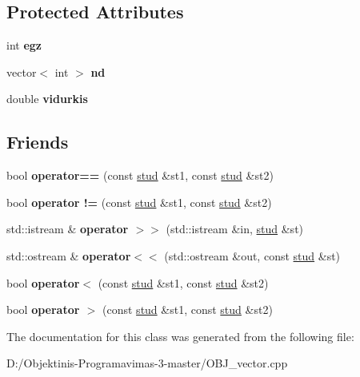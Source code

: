 \subsection*{Protected Attributes}
\begin{DoxyCompactItemize}
\item 
\mbox{\label{classstud_a4f0cd476d21347c3ded4b71eb5e92090}} 
int {\bfseries egz}
\item 
\mbox{\label{classstud_ab715143fae8186a247051f4a078244a8}} 
vector$<$ int $>$ {\bfseries nd}
\item 
\mbox{\label{classstud_ad6a131f5c8627777b639aa6a3517057c}} 
double {\bfseries vidurkis}
\end{DoxyCompactItemize}
\subsection*{Friends}
\begin{DoxyCompactItemize}
\item 
\mbox{\label{classstud_af32703f4aa5046a68c13598da31d9609}} 
bool {\bfseries operator==} (const \mbox{\hyperlink{classstud}{stud}} \&st1, const \mbox{\hyperlink{classstud}{stud}} \&st2)
\item 
\mbox{\label{classstud_aa80e47e60f6423fa8472493bc3ba4151}} 
bool {\bfseries operator !=} (const \mbox{\hyperlink{classstud}{stud}} \&st1, const \mbox{\hyperlink{classstud}{stud}} \&st2)
\item 
\mbox{\label{classstud_abbd02fbacac73f217f86dcb2c821205d}} 
std\+::istream \& {\bfseries operator $>$$>$} (std\+::istream \&in, \mbox{\hyperlink{classstud}{stud}} \&st)
\item 
\mbox{\label{classstud_a7e30725e930896616f7118b41109b766}} 
std\+::ostream \& {\bfseries operator$<$$<$} (std\+::ostream \&out, const \mbox{\hyperlink{classstud}{stud}} \&st)
\item 
\mbox{\label{classstud_a94bc530d1536257e3a28dd2ec8835078}} 
bool {\bfseries operator$<$} (const \mbox{\hyperlink{classstud}{stud}} \&st1, const \mbox{\hyperlink{classstud}{stud}} \&st2)
\item 
\mbox{\label{classstud_a2e9e1cea73c0c0654b15a8f2293623e3}} 
bool {\bfseries operator $>$} (const \mbox{\hyperlink{classstud}{stud}} \&st1, const \mbox{\hyperlink{classstud}{stud}} \&st2)
\end{DoxyCompactItemize}


The documentation for this class was generated from the following file\+:\begin{DoxyCompactItemize}
\item 
D\+:/\+Objektinis-\/\+Programavimas-\/3-\/master/O\+B\+J\+\_\+vector.\+cpp\end{DoxyCompactItemize}

